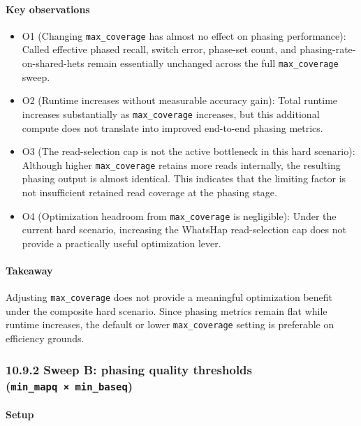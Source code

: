 \documentclass[
]{article}
\begin{document}
\paragraph{Key observations}\label{key-observations-7}

\begin{itemize}
\item
  O1 (Changing \texttt{max\_coverage} has almost no effect on phasing
  performance): Called effective phased recall, switch error, phase-set
  count, and phasing-rate-on-shared-hets remain essentially unchanged
  across the full \texttt{max\_coverage} sweep.
\item
  O2 (Runtime increases without measurable accuracy gain): Total runtime
  increases substantially as \texttt{max\_coverage} increases, but this
  additional compute does not translate into improved end-to-end phasing
  metrics.
\item
  O3 (The read-selection cap is not the active bottleneck in this hard
  scenario): Although higher \texttt{max\_coverage} retains more reads
  internally, the resulting phasing output is almost identical. This
  indicates that the limiting factor is not insufficient retained read
  coverage at the phasing stage.
\item
  O4 (Optimization headroom from \texttt{max\_coverage} is negligible):
  Under the current hard scenario, increasing the WhatsHap
  read-selection cap does not provide a practically useful optimization
  lever.
\end{itemize}

\paragraph{Takeaway}\label{takeaway-7}

Adjusting \texttt{max\_coverage} does not provide a meaningful
optimization benefit under the composite hard scenario. Since phasing
metrics remain flat while runtime increases, the default or lower
\texttt{max\_coverage} setting is preferable on efficiency grounds.

\subsubsection{\texorpdfstring{10.9.2 Sweep B: phasing quality
thresholds
(\texttt{min\_mapq\ ×\ min\_baseq})}{10.9.2 Sweep B: phasing quality thresholds (min\_mapq × min\_baseq)}}\label{sweep-b-phasing-quality-thresholds-min_mapq-min_baseq}

\paragraph{Setup}\label{setup-8}
\end{document}
